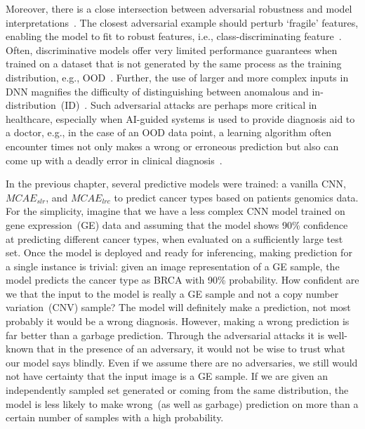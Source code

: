 \hspace*{3.5mm} Moreover, there is a close intersection between adversarial robustness and model interpretations~\cite{bhatt2020explainable,sharma2019certifai}. The closest adversarial example should perturb `fragile' features, enabling the model to fit to robust features, i.e., class-discriminating feature~\cite{bhatt2020explainable}. Often, discriminative models offer very limited performance guarantees when trained on a dataset that is not generated by the same process as the training distribution, e.g., OOD~\cite{OOD1}. Further, the use of larger and more complex inputs in DNN magnifies the difficulty of distinguishing between anomalous and in-distribution~(ID)~\cite{OOD5}. Such adversarial attacks are perhaps more critical in healthcare, especially when AI-guided systems is used to provide diagnosis aid to a doctor, e.g., in the case of an OOD data point, a learning algorithm often encounter times not only makes a wrong or erroneous prediction but also can come up with a deadly error in clinical diagnosis~\cite{OOD1}. 

\hspace*{3.5mm} In the previous chapter, several predictive models were trained: a vanilla CNN, $MCAE_{slr}$, and $MCAE_{lrc}$ to predict cancer types based on patients genomics data. For the simplicity, imagine that we have a less complex CNN model trained on gene expression~(GE) data and assuming that the model shows 90\% confidence at predicting different cancer types, when evaluated on a sufficiently large test set. Once the model is deployed and ready for inferencing, making prediction for a single instance is trivial: given an image representation of a GE sample, the model predicts the cancer type as BRCA with 90\% probability. How confident are we that the input to the model is really a GE sample and not a copy number variation~(CNV) sample? The model will definitely make a prediction, not most probably it would be a wrong diagnosis. However, making a wrong prediction is far better than a garbage prediction. Through the adversarial attacks it is well-known that in the presence of an adversary, it would not be wise to trust  what our model says blindly. Even if we assume there are no adversaries, we still would not have certainty that the input image is a GE sample. If we are given an independently sampled set generated or coming from the same distribution, the model is less likely to make wrong~(as well as garbage) prediction on more than a certain number of samples with a high probability.

